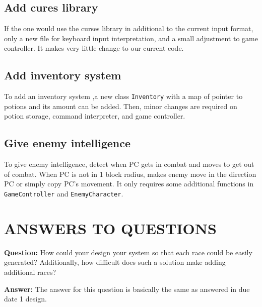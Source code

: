 \documentclass[11pt]{article}
\theoremstyle{plain} \newtheorem{theorem*}{Theorem}[subsection]
\begin{document}
\subsection{Add cures library}
If the one would use the curses library in additional to the current input format, 
only a new file for keyboard input interpretation, and a small adjustment to 
game controller. It makes very little change to our current code.

\subsection{Add inventory system}
To add an inventory system ,a new class \texttt{Inventory} with a map of pointer 
to potions and its amount can be added. Then, minor changes are required on potion 
storage, command interpreter, and game controller.

\subsection{Give enemy intelligence}
To give enemy intelligence, detect when PC gets in combat and moves to get out 
of combat. When PC is not in 1 block radius, makes enemy move in the direction 
PC or simply copy PC's movement. It only requires some additional functions in 
\texttt{GameController} and \texttt{EnemyCharacter}.






\vspace{0.3 in}
\section{ANSWERS TO QUESTIONS}

\textbf{Question:}
How could your design your system so that each race could be easily generated?
Additionally, how difficult does such a solution make adding additional races? 

\textbf{Answer:}
The answer for this question is basically the same as answered in due date 1
design. 
\end{document}
